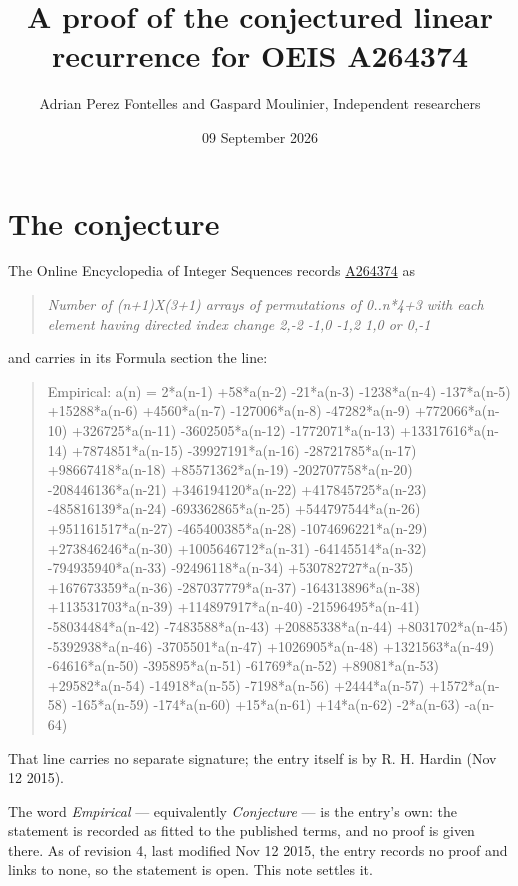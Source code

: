 \documentclass[11pt]{article}
\title{A proof of the conjectured linear recurrence for OEIS A264374}
\author{Adrian Perez Fontelles and Gaspard Moulinier, Independent researchers}
\date{09 September 2026}
\theoremstyle{definition}
\begin{document}
\maketitle
\section{The conjecture}

The Online Encyclopedia of Integer Sequences records \href{https://oeis.org/A264374}{A264374} as

\begin{quote}\itshape Number of (n+1)X(3+1) arrays of permutations of 0..n*4+3 with each element having directed index change 2,-2 -1,0 -1,2 1,0 or 0,-1\end{quote}

and carries in its Formula section the line:

\begin{quote}\ttfamily Empirical: a(n) = 2*a(n-1) +58*a(n-2) -21*a(n-3) -1238*a(n-4) -137*a(n-5) +15288*a(n-6) +4560*a(n-7) -127006*a(n-8) -47282*a(n-9) +772066*a(n-10) +326725*a(n-11) -3602505*a(n-12) -1772071*a(n-13) +13317616*a(n-14) +7874851*a(n-15) -39927191*a(n-16) -28721785*a(n-17) +98667418*a(n-18) +85571362*a(n-19) -202707758*a(n-20) -208446136*a(n-21) +346194120*a(n-22) +417845725*a(n-23) -485816139*a(n-24) -693362865*a(n-25) +544797544*a(n-26) +951161517*a(n-27) -465400385*a(n-28) -1074696221*a(n-29) +273846246*a(n-30) +1005646712*a(n-31) -64145514*a(n-32) -794935940*a(n-33) -92496118*a(n-34) +530782727*a(n-35) +167673359*a(n-36) -287037779*a(n-37) -164313896*a(n-38) +113531703*a(n-39) +114897917*a(n-40) -21596495*a(n-41) -58034484*a(n-42) -7483588*a(n-43) +20885338*a(n-44) +8031702*a(n-45) -5392938*a(n-46) -3705501*a(n-47) +1026905*a(n-48) +1321563*a(n-49) -64616*a(n-50) -395895*a(n-51) -61769*a(n-52) +89081*a(n-53) +29582*a(n-54) -14918*a(n-55) -7198*a(n-56) +2444*a(n-57) +1572*a(n-58) -165*a(n-59) -174*a(n-60) +15*a(n-61) +14*a(n-62) -2*a(n-63) -a(n-64)\end{quote}

That line carries no separate signature; the entry itself is by R. H. Hardin (Nov 12 2015).

The word {\itshape Empirical} --- equivalently {\itshape Conjecture} --- is the entry's own: the statement is recorded as fitted to the published terms, and no proof is given there. As of revision 4, last modified Nov 12 2015, the entry records no proof and links to none, so the statement is open. This note settles it.
\end{document}
